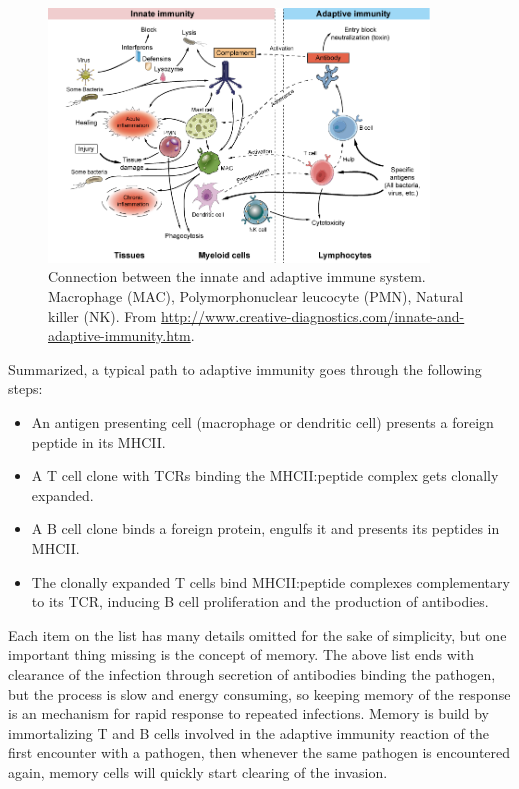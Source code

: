 \begin{figure}
    \centering
    \includegraphics[width=0.9\textwidth]{figures/innate_and_adaptive.png}
    \caption{
        \label{fig:innate_and_adaptive}
        Connection between the innate and adaptive immune system.
        Macrophage (MAC), Polymorphonuclear leucocyte (PMN), Natural killer (NK).
        From \url{http://www.creative-diagnostics.com/innate-and-adaptive-immunity.htm}.
    }
\end{figure}


Summarized, a typical path to adaptive immunity goes through the following steps:
\begin{itemize}
  \item An antigen presenting cell (macrophage or dendritic cell) presents a foreign peptide in its MHCII.
  \item A T cell clone with TCRs binding the MHCII:peptide complex gets clonally expanded.
  \item A B cell clone binds a foreign protein, engulfs it and presents its peptides in MHCII.
  \item The clonally expanded T cells bind MHCII:peptide complexes complementary to its TCR, inducing B cell proliferation and the production of antibodies.
\end{itemize}
Each item on the list has many details omitted for the sake of simplicity, but one important thing missing is the concept of memory.
The above list ends with clearance of the infection through secretion of antibodies binding the pathogen, but the process is slow and energy consuming, so keeping memory of the response is an mechanism for rapid response to repeated infections.
Memory is build by immortalizing T and B cells involved in the adaptive immunity reaction of the first encounter with a pathogen, then whenever the same pathogen is encountered again, memory cells will quickly start clearing of the invasion.







